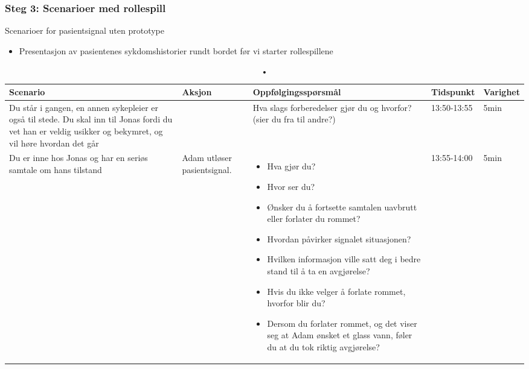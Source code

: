 \subsubsection{Steg 3: Scenarioer med rollespill}

Scenarioer for pasientsignal uten prototype

\begin{itemize}
\item Presentasjon av pasientenes sykdomshistorier rundt bordet før vi starter rollespillene
\end{itemize}

\begin{table}[H]
\small
\caption{•}
\begin{tabular}{p{3cm}|p{2cm}|p{4cm}|l|l}
\hline
\textbf{Scenario} & \textbf{Aksjon} & \textbf{Oppfølgingsspørsmål} & \textbf{Tidspunkt} & \textbf{Varighet}\\
\hline
Du står i gangen, en annen sykepleier er også til stede. Du skal inn til Jonas fordi du vet han er veldig usikker og bekymret, og vil høre hvordan det går & & Hva slags forberedelser gjør du og hvorfor? (sier du fra til andre?)
& 13:50-13:55 & 5min\\
\hline
Du er inne hos Jonas og har en seriøs samtale om hans tilstand & Adam utløser pasientsignal. & 
\begin{itemize}
\item Hva gjør du?
\item Hvor ser du?
\item Ønsker du å fortsette samtalen uavbrutt eller forlater du rommet?
\item Hvordan påvirker signalet situasjonen?
\item Hvilken informasjon ville satt deg i bedre stand til å ta en avgjørelse?
\item Hvis du ikke velger å forlate rommet, hvorfor blir du?
\item Dersom du forlater rommet, og det viser seg at Adam ønsket et glass vann, føler du at du tok riktig avgjørelse?
\end{itemize}
 & 13:55-14:00 & 5min\\
\end{tabular}
\label{Steg3.1}
\end{table}

